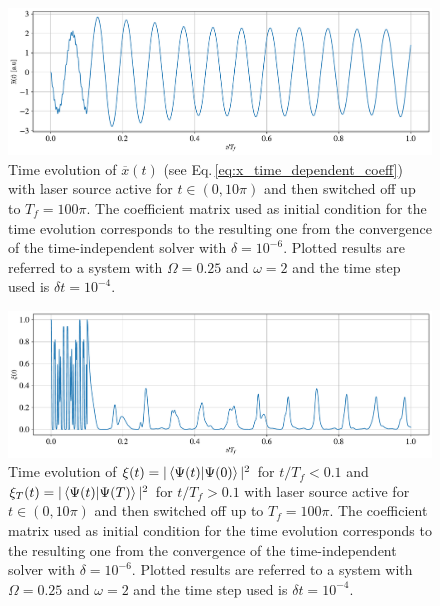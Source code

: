 \begin{figure}[h!]
    \centering
    \includegraphics[scale=0.5]{images/dipole_laser_ONOFF.pdf}
    \caption{Time evolution of $\overline{x}(t)$ (see Eq.\,\ref{eq:x_time_dependent_coeff}) with laser source active for $t\in(0, 10 \pi)$ and then switched off up to $T_f=100\pi$. The coefficient matrix used as initial condition for the time evolution corresponds to the resulting one from the convergence of the time-independent solver with $\delta=10^{-6}$. Plotted results are referred to a system with $\Omega=0.25$ and $\omega=2$ and the time step used is $\delta t = 10^{-4}$. }
    \label{fig:laser_on_off}
\end{figure}

\begin{figure}[h!]
    \centering
    \includegraphics[scale=0.5]{images/overlap_laser_ONOFF.pdf}
    \caption{Time evolution of $\xi (t)=\vert \braket{\Psi(t)}{\Psi(0)} \vert^2$ for $t/T_f<0.1$ and $\xi_T (t)=\vert \braket{\Psi(t)}{\Psi(T)} \vert^2$ for $t/T_f>0.1$ with laser source active for $t\in(0, 10 \pi)$ and then switched off up to $T_f=100\pi$. The coefficient matrix used as initial condition for the time evolution corresponds to the resulting one from the convergence of the time-independent solver with $\delta=10^{-6}$. Plotted results are referred to a system with $\Omega=0.25$ and $\omega=2$  and the time step used is $\delta t = 10^{-4}$. }
    \label{fig:overlap_T}
\end{figure}

